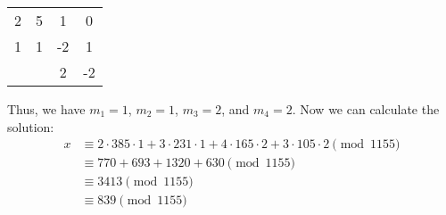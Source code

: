 \documentclass{article}
\begin{document}
\begin{solution}{}{}
\begin{center}
\begin{tabular}{c c c c}
            2 & 5 & 1 & 0 \\
            1 & 1 & -2 & 1 \\
            & & 2 & -2 \\
        \end{tabular}
    \end{center}
    Thus, we have $m_1=1$, $m_2=1$, $m_3=2$, and $m_4=2$. Now we can calculate the solution:
    \begin{align*}
        x &\equiv 2\cdot385\cdot1 + 3\cdot231\cdot1 + 4\cdot165\cdot2 + 3\cdot105\cdot2 \pmod{1155} \\
        &\equiv 770 + 693 + 1320 + 630 \pmod{1155} \\
        &\equiv 3413 \pmod{1155} \\
        &\equiv 839 \pmod{1155} \\
    \end{align*}
\end{solution}
\end{document}
